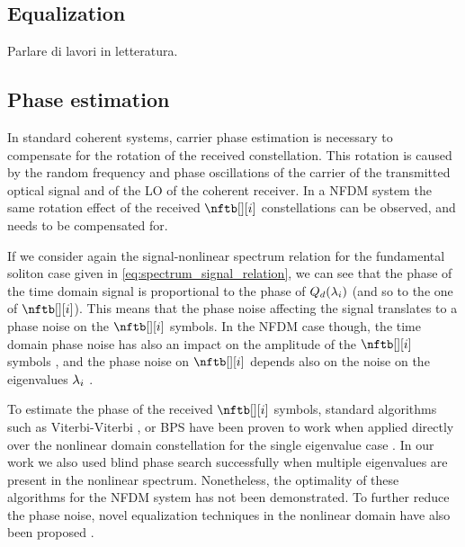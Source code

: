 \begin{extendedthesis}

\subsection{Equalization}
Parlare di lavori in letteratura.

\end{extendedthesis}


\subsection{Phase estimation}\label{sec:nfdm_phase_estimation}
In standard coherent systems, carrier phase estimation is necessary to compensate for the rotation of the received constellation. This rotation is caused by the random frequency and phase oscillations of the carrier of the transmitted optical signal and of the \ac{LO} of the coherent receiver.
In a \ac{NFDM} system the same rotation effect of the received  $\nftb[][i]$ constellations can be observed, and needs to be compensated for.

If we consider again the signal-nonlinear spectrum relation for the fundamental soliton case given in  \eqref{eq:spectrum_signal_relation}, we can see that the phase of the time domain signal is proportional to the phase of $\dnft[i]$ (and so to the one of $\nftb[][i]$). This means that the phase noise affecting the signal translates to a phase noise on the $\nftb[][i]$ symbols. In the \ac{NFDM} case though, the time domain phase noise has also an impact on the amplitude  of the $\nftb[][i]$ symbols \cite{gui2016phase}, and the phase noise on $\nftb[][i]$ depends also on the noise on the eigenvalues $\eig[i]$ \cite{bulow2016experimental}.

To estimate the phase of the received $\nftb[][i]$ symbols, standard algorithms such as Viterbi-Viterbi \cite{viterbi2010nonlinear}, or \ac{BPS} \cite{pfau2009hardware} have been proven to work when applied directly over the nonlinear domain constellation for the single eigenvalue case \cite{gui2016phase}. In our work \cite{GaiarinECOC17} we also used blind phase search successfully when multiple eigenvalues are present in the nonlinear spectrum. Nonetheless, the optimality of these algorithms for the \ac{NFDM} system has not been demonstrated.
To further reduce the phase noise, novel equalization techniques in the nonlinear domain have also been proposed \cite{aref2016spectral, HongKong}.

